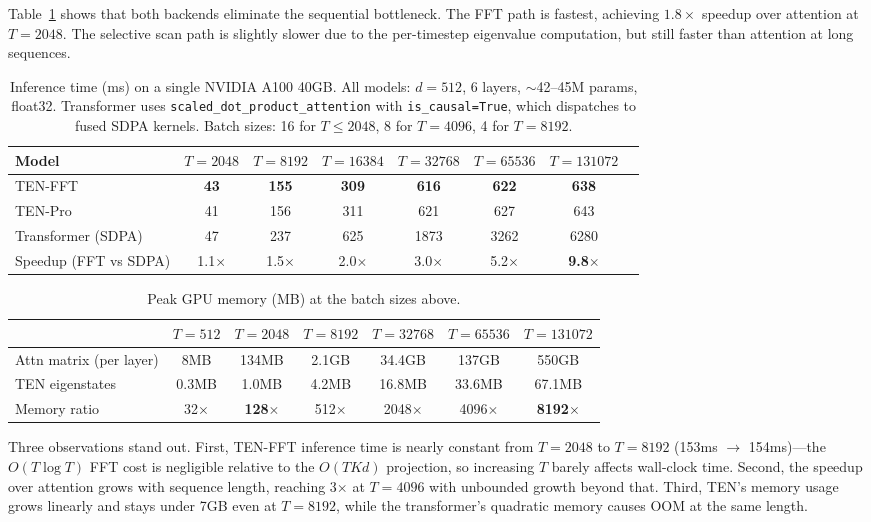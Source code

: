 \documentclass{article}
\begin{document}
Table~\ref{tab:speed} shows that both backends eliminate the sequential bottleneck. The FFT path is fastest, achieving $1.8\times$ speedup over attention at $T = 2048$. The selective scan path is slightly slower due to the per-timestep eigenvalue computation, but still faster than attention at long sequences.

\begin{table}[h]
\centering
\caption{Inference time (ms) on a single NVIDIA A100 40GB. All models: $d = 512$, 6 layers, $\sim$42--45M params, float32. Transformer uses \texttt{scaled\_dot\_product\_attention} with \texttt{is\_causal=True}, which dispatches to fused SDPA kernels. Batch sizes: 16 for $T \leq 2048$, 8 for $T = 4096$, 4 for $T = 8192$.}
\label{tab:speed}
\begin{tabular}{lccccccc}
\toprule
Model & $T\!=\!2048$ & $T\!=\!8192$ & $T\!=\!16384$ & $T\!=\!32768$ & $T\!=\!65536$ & $T\!=\!131072$ \\
\midrule
TEN-FFT & \textbf{43} & \textbf{155} & \textbf{309} & \textbf{616} & \textbf{622} & \textbf{638} \\
TEN-Pro & 41 & 156 & 311 & 621 & 627 & 643 \\
Transformer (SDPA) & 47 & 237 & 625 & 1873 & 3262 & 6280 \\
\midrule
Speedup (FFT vs SDPA) & 1.1$\times$ & 1.5$\times$ & 2.0$\times$ & 3.0$\times$ & 5.2$\times$ & \textbf{9.8}$\times$ \\
\bottomrule
\end{tabular}
\end{table}

\begin{table}[h]
\centering
\caption{Peak GPU memory (MB) at the batch sizes above.}
\label{tab:memory}
\begin{tabular}{lcccccc}
\toprule
& $T\!=\!512$ & $T\!=\!2048$ & $T\!=\!8192$ & $T\!=\!32768$ & $T\!=\!65536$ & $T\!=\!131072$ \\
\midrule
Attn matrix (per layer) & 8MB & 134MB & 2.1GB & 34.4GB & 137GB & 550GB \\
TEN eigenstates & 0.3MB & 1.0MB & 4.2MB & 16.8MB & 33.6MB & 67.1MB \\
\midrule
Memory ratio & 32$\times$ & \textbf{128}$\times$ & 512$\times$ & 2048$\times$ & 4096$\times$ & \textbf{8192}$\times$ \\
\bottomrule
\end{tabular}
\end{table}

Three observations stand out. First, TEN-FFT inference time is nearly constant from $T = 2048$ to $T = 8192$ (153ms $\to$ 154ms)---the $O(T \log T)$ FFT cost is negligible relative to the $O(TKd)$ projection, so increasing $T$ barely affects wall-clock time. Second, the speedup over attention grows with sequence length, reaching 3$\times$ at $T = 4096$ with unbounded growth beyond that. Third, TEN's memory usage grows linearly and stays under 7GB even at $T = 8192$, while the transformer's quadratic memory causes OOM at the same length.
\end{document}
